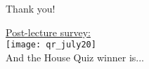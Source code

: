 \documentclass[aspectratio=169]{beamer}
\begin{document}
\begin{frame}[plain]
	\begin{center} Thank you! \end{center}

	\begin{center}
    {\color{blue} \href{https://docs.google.com/forms/d/e/1FAIpQLSd-hUtmsPshw7PxEBf4mZFiNHEromtgmIa85bsHu232yEpdXA/viewform?usp=sf_link}{Post-lecture survey:}} \\
    \vspace{5pt}
    \texttt{[image: qr\_july20]} \\
    \vspace{5pt}
    And the House Quiz winner is...
  \end{center}
\end{frame}
\end{document}
